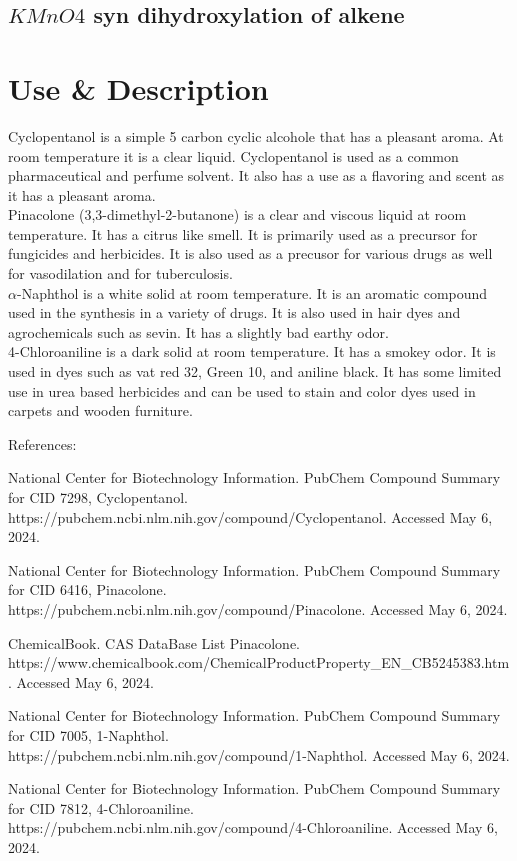 \documentclass[11pt]{article}
\begin{document}
	\subsection{$KMnO4$ syn dihydroxylation of alkene}
	
	\pagebreak
	\section{Use \& Description}
	Cyclopentanol is a simple 5 carbon cyclic alcohole  that has a pleasant aroma. At room temperature it is a clear liquid. Cyclopentanol is used as a common pharmaceutical and perfume solvent. It also has a use as a flavoring and scent as it has a pleasant aroma. \\
	
	Pinacolone (3,3-dimethyl-2-butanone) is a clear and viscous liquid at room temperature. It has a citrus like smell. It is primarily used as a precursor for fungicides and herbicides. It is also used as a precusor for various drugs as well for vasodilation and for tuberculosis. \\
	
	$\alpha$-Naphthol is a white solid at room temperature. It is an aromatic compound used in the synthesis in a variety of drugs. It is also used in hair dyes and agrochemicals such as sevin. It has a slightly bad earthy odor.\\
	
	4-Chloroaniline is a dark solid at room temperature. It has a smokey odor. It is used in dyes such as vat red 32, Green 10, and aniline black. It has some limited use in urea based herbicides and can be used to stain and color dyes used in carpets and wooden furniture.\\
	
	{\small
	References: 
	
	National Center for Biotechnology Information. PubChem Compound Summary for CID 7298, Cyclopentanol.\\ https://pubchem.ncbi.nlm.nih.gov/compound/Cyclopentanol. Accessed May 6, 2024.
	

	National Center for Biotechnology Information. PubChem Compound Summary for CID 6416, Pinacolone.\\ https://pubchem.ncbi.nlm.nih.gov/compound/Pinacolone. Accessed May 6, 2024.
	
	ChemicalBook. CAS DataBase List Pinacolone.\\ https://www.chemicalbook.com/ChemicalProductProperty\_EN\_CB5245383.htm. Accessed May 6, 2024.
	
	National Center for Biotechnology Information. PubChem Compound Summary for CID 7005, 1-Naphthol.\\ https://pubchem.ncbi.nlm.nih.gov/compound/1-Naphthol. Accessed May 6, 2024.
	
	National Center for Biotechnology Information. PubChem Compound Summary for CID 7812, 4-Chloroaniline.\\ https://pubchem.ncbi.nlm.nih.gov/compound/4-Chloroaniline. Accessed May 6, 2024.}
	\pagebreak
\end{document}
